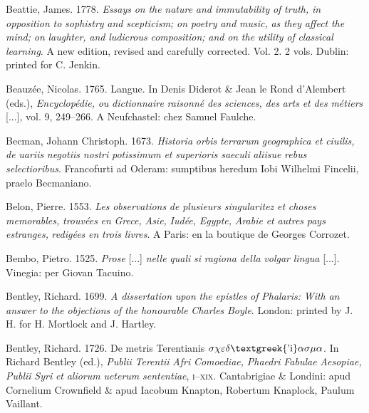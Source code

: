 \documentclass[output=paper]{langsci/langscibook}
\begin{document}
Beattie, James. 1778. \textit{Essays} \textit{on} \textit{the} \textit{nature} \textit{and} \textit{immutability} \textit{of} \textit{truth,} \textit{in} \textit{opposition} \textit{to} \textit{sophistry} \textit{and} \textit{scepticism;} \textit{on} \textit{poetry} \textit{and} \textit{music,} \textit{as} \textit{they} \textit{affect} \textit{the} \textit{mind;} \textit{on} \textit{laughter,} \textit{and} \textit{ludicrous} \textit{composition;} \textit{and} \textit{on} \textit{the} \textit{utility} \textit{of} \textit{classical} \textit{learning}. A new edition, revised and carefully corrected. Vol. 2. 2 vols. Dublin: printed for C. Jenkin.

Beauzée, Nicolas. 1765. Langue. In Denis Diderot \& Jean le Rond d’Alembert (eds.), \textit{Encyclopédie,} \textit{ou} \textit{dictionnaire} \textit{raisonné} \textit{des} \textit{sciences,} \textit{des} \textit{arts} \textit{et} \textit{des} \textit{métiers} [...], vol. 9, 249–266. A Neufchastel: chez Samuel Faulche.

Becman, Johann Christoph. 1673. \textit{Historia} \textit{orbis} \textit{terrarum} \textit{geographica} \textit{et} \textit{ciuilis,} \textit{de} \textit{uariis} \textit{negotiis} \textit{nostri} \textit{potissimum} \textit{et} \textit{superioris} \textit{saeculi} \textit{aliisue} \textit{rebus} \textit{selectioribus}. Francofurti ad Oderam: sumptibus heredum Iobi Wilhelmi Fincelii, praelo Becmaniano.

Belon, Pierre. 1553. \textit{Les} \textit{observations} \textit{de} \textit{plusieurs} \textit{singularitez} \textit{et} \textit{choses} \textit{memorables,} \textit{trouvées} \textit{en} \textit{Grece,} \textit{Asie,} \textit{Iudée,} \textit{Egypte,} \textit{Arabie} \textit{et} \textit{autres} \textit{pays} \textit{estranges,} \textit{redigées} \textit{en} \textit{trois} \textit{livres}. A Paris: en la boutique de Georges Corrozet.

Bembo, Pietro. 1525. \textit{Prose} [...] \textit{nelle} \textit{quali} \textit{si} \textit{ragiona} \textit{della} \textit{volgar} \textit{lingua} [...]. Vinegia: per Giovan Tacuino.

Bentley, Richard. 1699. \textit{A} \textit{dissertation} \textit{upon} \textit{the} \textit{epistles} \textit{of} \textit{Phalaris:} \textit{With} \textit{an} \textit{answer} \textit{to} \textit{the} \textit{objections} \textit{of} \textit{the} \textit{honourable} \textit{Charles} \textit{Boyle}. London: printed by J. H. for H. Mortlock and J. Hartley.

Bentley, Richard. 1726. De metris Terentianis $\sigma \chi \varepsilon \delta \text{\textgreek{'i}}\alpha \sigma \mu \alpha $. In Richard Bentley (ed.), \textit{Publii} \textit{Terentii} \textit{Afri} \textit{Comoediae,} \textit{Phaedri} \textit{Fabulae} \textit{Aesopiae,} \textit{Publii} \textit{Syri} \textit{et} \textit{aliorum} \textit{ueterum} \textit{sententiae}, \textsc{i}–\textsc{xix}. Cantabrigiae \& Londini: apud Cornelium Crownfield \& apud Iacobum Knapton, Robertum Knaplock, Paulum Vaillant.
\end{document}
